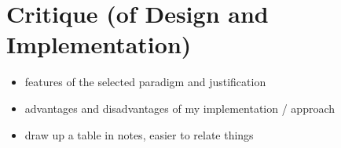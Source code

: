 \section{Critique (of Design and Implementation)}
\begin{itemize}
	\item features of the selected paradigm and justification
	\item advantages and disadvantages of my implementation / approach
	\item draw up a table in notes, easier to relate things
\end{itemize}
